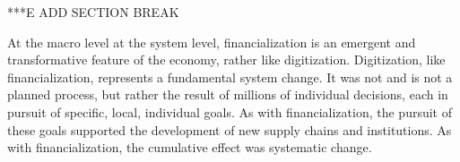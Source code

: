 
***E ADD SECTION BREAK

At the macro level at the system level, financialization is an emergent and transformative feature of the economy, rather like digitization. Digitization, like financialization, represents a fundamental  system  change. It was not and is not a planned process, but rather the result of millions of individual decisions, each in pursuit of specific, local, individual goals.  As with  financialization, the pursuit of these goals supported the development of new supply chains and institutions.  As with  financialization, the cumulative effect was systematic change.








